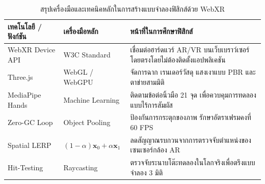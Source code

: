 \begin{table}[H]
\centering
\small
\begin{tabularx}{\textwidth}{l >{\centering\arraybackslash}p{3.8cm} Y}
\toprule
\textbf{เทคโนโลยี / ฟังก์ชัน} & \textbf{เครื่องมือหลัก} & \textbf{หน้าที่ในการศึกษาฟิสิกส์} \\
\midrule
WebXR Device API & W3C Standard & เชื่อมต่อฮาร์ดแวร์ AR/VR บนเว็บเบราว์เซอร์โดยตรงโดยไม่ต้องติดตั้งแอปพลิเคชัน \\
Three.js & WebGL / WebGPU & จัดการฉาก เรนเดอร์วัสดุ แสงเงาแบบ PBR และตาข่ายสามมิติ \\
MediaPipe Hands & Machine Learning & ติดตามข้อต่อนิ้วมือ 21 จุด เพื่อควบคุมการทดลองแบบไร้การสัมผัส \\
Zero-GC Loop & Object Pooling & ป้องกันการกระตุกของภาพ รักษาอัตราเฟรมคงที่ 60 FPS \\
Spatial LERP & $(1-\alpha)\mathbf{x}_0 + \alpha\mathbf{x}_1$ & ลดสัญญาณรบกวนจากการตรวจจับตำแหน่งของเซนเซอร์กล้อง AR \\
Hit-Testing & Raycasting & ตรวจจับระนาบโต๊ะทดลองในโลกจริงเพื่อตรึงแบบจำลอง 3 มิติ \\
\bottomrule
\end{tabularx}
\caption{สรุปเครื่องมือและเทคนิคหลักในการสร้างแบบจำลองฟิสิกส์ด้วย WebXR}
\label{tab:ar_xr_summary_intro}
\end{table}

\newpage

